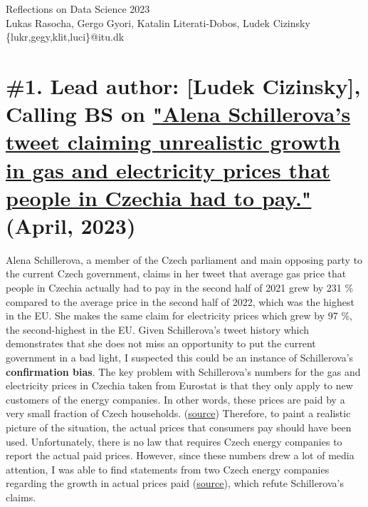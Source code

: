\documentclass[fleqn,12pt]{article}
\begin{document}
\setlength{\baselineskip}{1.15\baselineskip}



\begin{center}
  {\Huge Reflections on Data Science 2023}\\[2ex]
  {Lukas Rasocha, Gergo Gyori, Katalin Literati-Dobos, Ludek Cizinsky}\\
  [2ex]
  {\{lukr,gegy,klit,luci\}@itu.dk}\\[2ex]
\end{center}

\tableofcontents


\parindent=20pt 
\parskip=0mm
\newpage

\section{\#1. Lead author: [Ludek Cizinsky], Calling BS on \href{https://twitter.com/alenaschillerov/status/1651167356687732736?s=20}{"Alena Schillerova's tweet claiming unrealistic growth in gas and electricity prices that people in Czechia had to pay."} (April, 2023)} 
Alena Schillerova, a member of the Czech parliament and main opposing party to the current Czech government, claims in her tweet that average gas price 
that people in Czechia actually had to pay in the second half of 2021 grew by 231 \% compared to the average price 
in the second half of 2022, which was the highest in the EU. She makes the same claim for electricity prices which grew by 97 \%, 
the second-highest in the EU. Given Schillerova's tweet history which demonstrates that she does not miss an opportunity to put 
the current government in a bad light, I suspected this could be an instance of Schillerova's \textbf{confirmation bias}. 
The key problem with Schillerova's numbers for the gas and electricity prices in Czechia taken from Eurostat is that they only apply to new customers of the 
energy companies. In other words, these prices are paid by a very small fraction of Czech households. (\href{https://www.idnes.cz/ekonomika/domaci/cena-plyn-cesko-lonsky-rust-eurostat.A230426_124224_ekonomika_vebe}{source})
Therefore, to paint a realistic picture of the situation, the actual prices that consumers pay should have been used. 
Unfortunately, there is no law that requires Czech energy companies to report the actual paid prices. 
However, since these numbers drew a lot of media attention, I was able to find statements from two Czech energy companies regarding the 
growth in actual prices paid (\href{https://www.idnes.cz/ekonomika/domaci/cena-plyn-cesko-lonsky-rust-eurostat.A230426_124224_ekonomika_vebe}{source}), which refute Schillerova's claims. 
\end{document}
